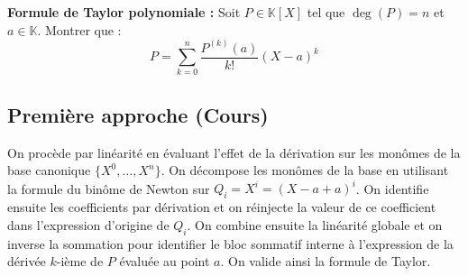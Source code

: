 \documentclass[11pt, a4paper]{article}
\theoremstyle{definition}
\begin{document}
\clearpage

\begin{tcolorbox}[instructionstyle]

\textbf{Formule de Taylor polynomiale :} Soit $P \in \mathbb{K}[X]$ tel que $\deg(P) = n$ et $a \in \mathbb{K}$. Montrer que :
\[
P = \sum_{k=0}^n \frac{P^{(k)}(a)}{k!}(X-a)^k
\]
\end{tcolorbox}

\subsection*{Première approche (Cours)}

\begin{tcolorbox}[methodstyle]
  On procède par linéarité en évaluant l'effet de la dérivation sur les monômes de la base canonique $\{X^0, \dots, X^n\}$. On décompose les monômes de la base en utilisant la formule du binôme de Newton sur $Q_i = X^i = (X-a+a)^i$. On identifie ensuite les coefficients par dérivation et on réinjecte la valeur de ce coefficient dans l'expression d'origine de $Q_i$. On combine ensuite la linéarité globale et on inverse la sommation pour identifier le bloc sommatif interne à l'expression de la dérivée $k$-ième de $P$ évaluée au point $a$. On valide ainsi la formule de Taylor.
\end{tcolorbox}
\end{document}
